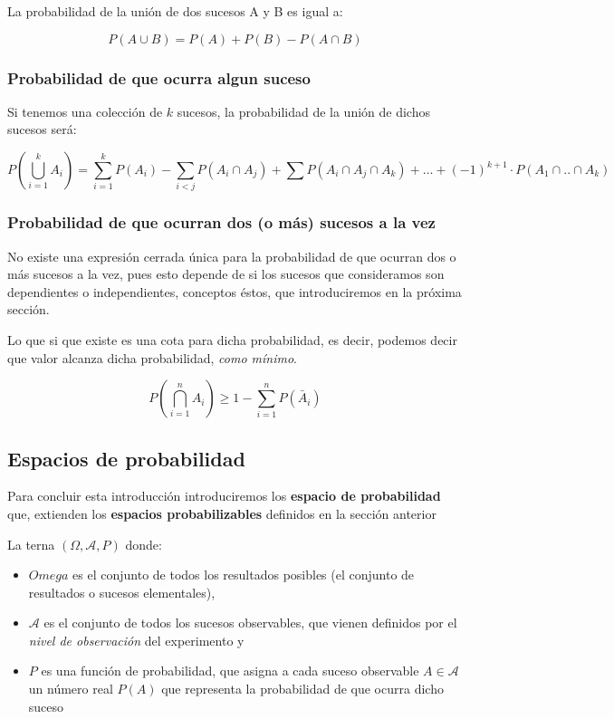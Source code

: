 \documentclass[
]{article}
\providecommand{\tightlist}{%
  \setlength{\itemsep}{0pt}\setlength{\parskip}{0pt}}
\begin{document}
La probabilidad de la unión de dos sucesos A y B es igual a:

\[
P(A \cup B)=P(A)+P(B)-P(A \cap B)
\]

\subsubsection{Probabilidad de que ocurra algun suceso}\label{probabilidad-de-que-ocurra-algun-suceso}

Si tenemos una colección de \(k\) sucesos, la probabilidad de la unión de
dichos sucesos será:

\[
P\left(\bigcup_{i=1}^{k} A_{i}\right)=\sum_{i=1}^{k} P\left(A_{i}\right)-\sum_{i<j} P\left(A_{i} \cap A_{j}\right)+\sum P\left(A_{i} \cap A_{j} \cap A_{k}\right)+\ldots+(-1)^{k+1} \cdot P\left(A_{1} \cap . . \cap A_{k}\right)
\]

\subsubsection{Probabilidad de que ocurran dos (o más) sucesos a la vez}\label{probabilidad-de-que-ocurran-dos-o-muxe1s-sucesos-a-la-vez}

No existe una expresión cerrada única para la probabilidad de que ocurran dos o más sucesos a la vez, pues esto depende de si los sucesos que consideramos son dependientes o independientes, conceptos éstos, que introduciremos en la próxima sección.

Lo que si que existe es una cota para dicha probabilidad, es decir, podemos decir que valor alcanza dicha probabilidad, \emph{como mínimo}.

\[
P\left(\bigcap_{i=1}^{n} A_{i}\right) \geq 1-\sum_{i=1}^{n} P\left(\bar{A}_{i}\right)
\]

\subsection{Espacios de probabilidad}\label{espacios-de-probabilidad}

Para concluir esta introducción introduciremos los \textbf{espacio de probabilidad} que, extienden los \textbf{espacios probabilizables} definidos en la sección anterior

La terna \((\Omega, \mathcal{A}, P)\) donde:

\begin{itemize}
\tightlist
\item
  \(Omega\) es el conjunto de todos los resultados posibles (el conjunto de resultados o sucesos elementales),
\item
  \(\mathcal{A}\) es el conjunto de todos los sucesos observables, que vienen definidos por el \emph{nivel de observación} del experimento y
\item
  \(P\) es una función de probabilidad, que asigna a cada suceso observable \(A \in \mathcal{A}\) un número real \(P(A)\) que representa la probabilidad de que ocurra dicho suceso
\end{itemize}
\end{document}
